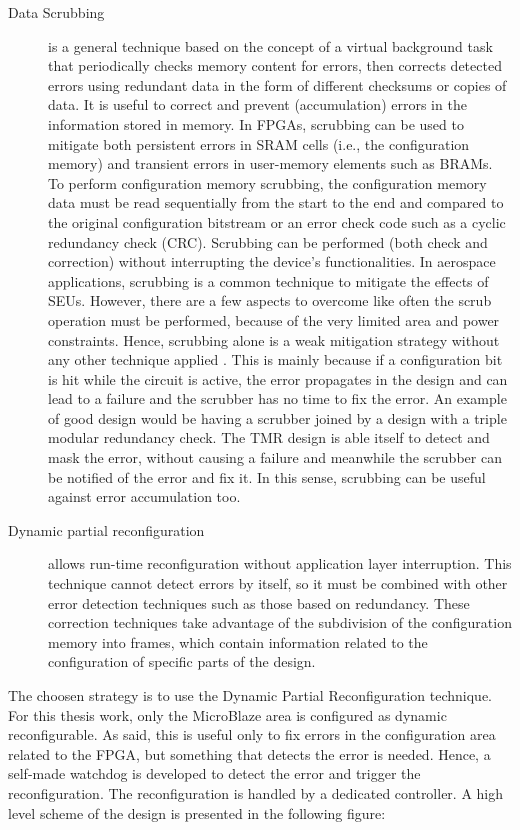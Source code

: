 \begin{description}
    \item[Data Scrubbing] is a general technique based on the concept of a virtual background task that periodically checks memory content for errors, then corrects detected errors using redundant data in the form of different checksums or copies of data. It is useful to correct and prevent (accumulation) errors in the information stored in memory. In FPGAs, scrubbing can be used to mitigate both persistent errors in SRAM cells (i.e., the configuration memory) and transient errors in user-memory elements such as BRAMs. To perform configuration memory scrubbing, the configuration memory data must be read sequentially from the start to the end and compared to the original configuration bitstream or an error check code such as a cyclic redundancy check (CRC). Scrubbing can be performed (both check and correction) without interrupting the device's functionalities. In aerospace applications, scrubbing is a common technique to mitigate the effects of SEUs. However, there are a few aspects to overcome like often the scrub operation must be performed, because of the very limited area and power constraints. Hence, scrubbing alone is a weak mitigation strategy without any other technique applied \cite{nasa_scrubbing}. This is mainly because if a configuration bit is hit while the circuit is active, the error propagates in the design and can lead to a failure and the scrubber has no time to fix the error. An example of good design would be having a scrubber joined by a design with a triple modular redundancy check. The TMR design is able itself to detect and mask the error, without causing a failure and meanwhile the scrubber can be notified of the error and fix it. In this sense, scrubbing can be useful against error accumulation too.
    \item[Dynamic partial reconfiguration] \cite{10.1007/978-3-030-44534-8_7} allows run-time reconfiguration without application layer interruption. This technique cannot detect errors by itself, so it must be combined with other error detection techniques such as those based on redundancy. These correction techniques take advantage of the subdivision of the configuration memory into frames, which contain information related to the configuration of specific parts of the design. 
\end{description}

The choosen strategy is to use the Dynamic Partial Reconfiguration technique. For this thesis work, only the MicroBlaze area is configured as dynamic reconfigurable. As said, this is useful only to fix errors in the configuration area related to the FPGA, but something that detects the error is needed. Hence, a self-made watchdog is developed to detect the error and trigger the reconfiguration. The reconfiguration is handled by a dedicated controller. A high level scheme of the design is presented in the following figure:


